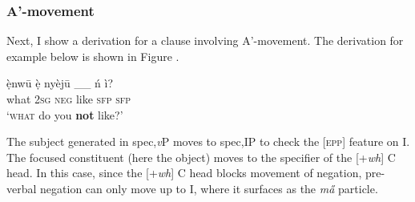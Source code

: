 \documentclass[output=paper,colorlinks,citecolor=brown,
]{langscibook}
\begin{document}


\subsubsection{A'-movement}

Next, I show a derivation for a clause involving A'-movement. The derivation for example  below is shown in Figure . 

\ea \label{ex:chaperon:abar}
\gll \`{ẹ}nw\={u} \`{ẹ}  {ny}\`{e}j\={u} \_\_ \'{n} \`{i}?\\
        what     \textsc{2sg}     \textsc{neg}     like  {}   \textsc{sfp} \textsc{sfp}\\
       \glt `\textsc{what} do you \textbf{not} like?'
\z

The subject generated in spec,\textit{v}P moves to spec,IP to check the [\textsc{epp}] feature on I\xhead{}. %
The focused constituent (here the object) moves to the specifier of the [+\textit{wh}] C head. In this case, since the [+\textit{wh}] C head blocks movement of negation, pre-verbal negation can only move up to I\xhead{}, where it surfaces as the \textit{m\H{a}} particle.
\end{document}
